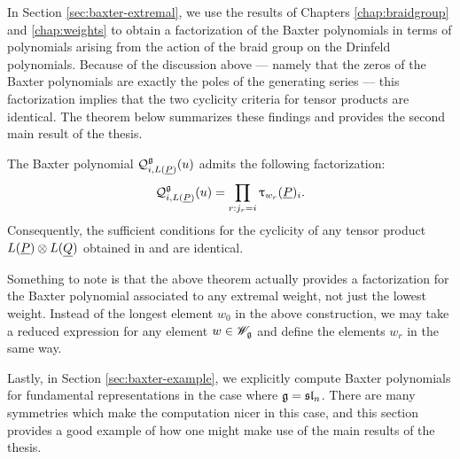 In Section \ref{sec:baxter-extremal}, we use the results of Chapters \ref{chap:braidgroup} and \ref{chap:weights} to obtain a factorization of the Baxter polynomials in terms of polynomials arising from the action of the braid group on the Drinfeld polynomials.
Because of the discussion above --- namely that the zeros of the Baxter polynomials are exactly the poles of the generating series --- this factorization implies that the two cyclicity criteria for tensor products are identical.
The theorem below summarizes these findings and provides the second main result of the thesis.

\begin{theorem}\label{T:intro-main2}
    The Baxter polynomial $\mathcal{Q}_{i,L(\underline{P})}^{\mathfrak{g}}(u)$ admits the following factorization:
    \[\mathcal{Q}_{i,L(\underline{P})}^{\mathfrak{g}}(u) = \prod_{r:j_r=i}\uptau_{w_r}(\underline{P})_i.\]
    Consequently, the sufficient conditions for the cyclicity of any tensor product $L(\underline{P})\otimes L(\underline{Q})$ obtained in \cite{tan_braid_2015} and \cite{gautam_poles_2023} are identical.
\end{theorem}

Something to note is that the above theorem actually provides a factorization for the Baxter polynomial associated to any extremal weight, not just the lowest weight.
Instead of the longest element $w_0$ in the above construction, we may take a reduced expression for any element $w\in\mathscr{W}_{\mathfrak{g}}$ and define the elements $w_r$ in the same way.

Lastly, in Section \ref{sec:baxter-example}, we explicitly compute Baxter polynomials for fundamental representations in the case where $\mathfrak{g}=\mathfrak{sl}_n$.
There are many symmetries which make the computation nicer in this case, and this section provides a good example of how one might make use of the main results of the thesis.
